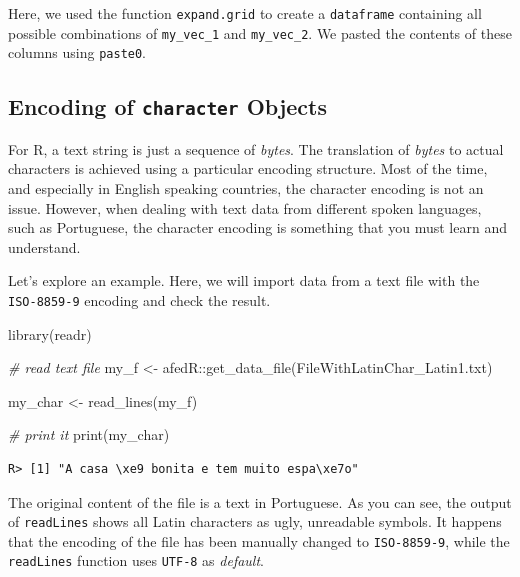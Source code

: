 \documentclass[
  12pt,
]{book}
\newenvironment{Shaded}{\begin{snugshade}}{\end{snugshade}}
\newcommand{\CommentTok}[1]{\textcolor[rgb]{0.37,0.37,0.37}{\textit{#1}}}
\newcommand{\FunctionTok}[1]{\textcolor[rgb]{0,0,0}{#1}}
\newcommand{\NormalTok}[1]{#1}
\newcommand{\OtherTok}[1]{\textcolor[rgb]{0.37,0.37,0.37}{#1}}
\newcommand{\SpecialCharTok}[1]{\textcolor[rgb]{0,0,0}{#1}}
\newcommand{\StringTok}[1]{\textcolor[rgb]{0.5,0.5,0.5}{#1}}
\begin{document}
Here, we used the function \texttt{expand.grid} to create a \texttt{dataframe} containing all possible combinations of \texttt{my\_vec\_1} and \texttt{my\_vec\_2}. We pasted the contents of these columns using \texttt{paste0}.

\hypertarget{encoding-of-character-objects}{%
\subsection{\texorpdfstring{Encoding of \texttt{character} Objects}{Encoding of character Objects}}\label{encoding-of-character-objects}}

For R, a text string is just a sequence of \emph{bytes}. The translation of \emph{bytes} to actual characters is achieved using a particular encoding structure. Most of the time, and especially in English speaking countries, the character encoding is not an issue. However, when dealing with text data from different spoken languages, such as Portuguese, the character encoding is something that you must learn and understand.

Let's explore an example. Here, we will import data from a text file with the \texttt{\textquotesingle{}ISO-8859-9\textquotesingle{}} encoding and check the result.

\begin{Shaded}
\begin{Highlighting}[]
\FunctionTok{library}\NormalTok{(readr)}

\CommentTok{\# read text file}
\NormalTok{my\_f }\OtherTok{\textless{}{-}}\NormalTok{ afedR}\SpecialCharTok{::}\FunctionTok{get\_data\_file}\NormalTok{(}\StringTok{\textquotesingle{}FileWithLatinChar\_Latin1.txt\textquotesingle{}}\NormalTok{)}

\NormalTok{my\_char }\OtherTok{\textless{}{-}} \FunctionTok{read\_lines}\NormalTok{(my\_f)}

\CommentTok{\# print it}
\FunctionTok{print}\NormalTok{(my\_char)}
\end{Highlighting}
\end{Shaded}

\begin{verbatim}
R> [1] "A casa \xe9 bonita e tem muito espa\xe7o"
\end{verbatim}

The original content of the file is a text in Portuguese. As you can see, the output of \texttt{readLines} shows all Latin characters as ugly, unreadable symbols. It happens that the encoding of the file has been manually changed to \texttt{\textquotesingle{}ISO-8859-9\textquotesingle{}}, while the \texttt{readLines} function uses \texttt{\textquotesingle{}UTF-8\textquotesingle{}} as \emph{default}.
\end{document}
